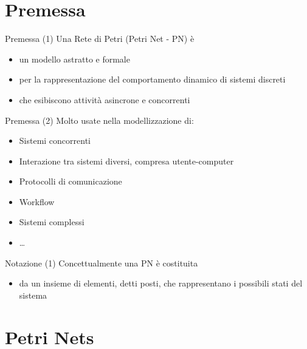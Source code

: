 \section{Premessa}

\begin{frame}{Premessa (1)}
Una Rete di Petri (Petri Net - PN) è
\begin{itemize}
	\item un \alert{modello} astratto e formale
	\item per la rappresentazione del \alert{comportamento dinamico} di sistemi \alert{discreti}
	\item che esibiscono attività \alert{asincrone e concorrenti}
\end{itemize}
\end{frame}

\begin{frame}{Premessa (2)}
	Molto usate nella modellizzazione di:
	\begin{itemize}
		\item Sistemi concorrenti
		\item Interazione tra sistemi diversi, compresa utente-computer
		\item Protocolli di comunicazione
        \item Workflow
        \item Sistemi complessi
        \item \dots
	\end{itemize}
\end{frame}

\begin{frame}{Notazione (1)}
    Concettualmente una PN è costituita
    \begin{itemize}
        \item da un insieme di elementi, detti \alert{posti}, che rappresentano i possibili stati del sistema
    \end{itemize}
\end{frame}

\section{Petri Nets}

